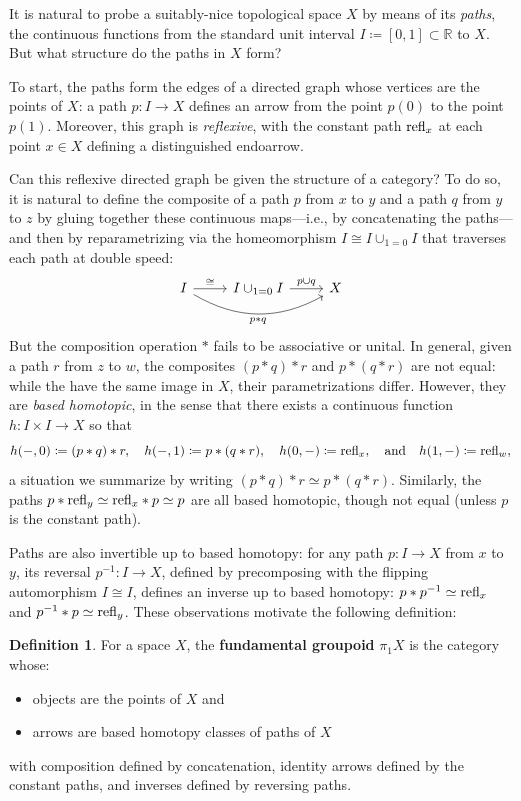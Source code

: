 \documentclass[11pt]{ctexart}
\theoremstyle{definition}
\newtheorem{defn}[thm]{Definition}
\theoremstyle{remark}
\numberwithin{equation}{section}
\newcommand{\refl}{\textup{refl}}
\newcommand{\RR}{\mathbb{R}}
\newcommand{\1}{\mathbbe{1}}
\newcommand{\2}{\mathbbe{2}}
\newcommand{\3}{\mathbbe{3}}
\begin{document}
It is natural to probe a suitably-nice topological space $X$ by means of its \emph{paths}, the continuous functions from the standard unit interval $I\coloneqq [0,1] \subset \RR$ to $X$. But what structure do the paths in $X$ form?

To start, the paths form the edges of a directed graph whose vertices are the points of $X$: a path $p \colon I \to X$ defines an arrow from the point $p(0)$ to the point $p(1)$. Moreover, this graph is \emph{reflexive}, with the constant path $\refl_x$ at each point $x \in X$ defining a distinguished endoarrow.

Can this reflexive directed graph be given the structure of a category? To do so, it is natural to define the composite of a path $p$ from $x$ to $y$ and a path $q$ from $y$ to $z$ by gluing together these continuous maps---i.e., by concatenating the paths---and then by reparametrizing via the homeomorphism $I \cong I \cup_{1=0} I$ that traverses each path at double speed:
\begin{equation}\label{eq:path-comp}
    \begin{tikzcd}
        I \arrow[r, "\cong"] \arrow[rr, bend right, "p \ast q"'] & I \cup_{1=0} I \arrow[r, "p \cup q"] & X
    \end{tikzcd}
\end{equation}
But the composition operation $\ast$ fails to be associative or unital. In general, given a path $r$ from $z$ to $w$, the composites $(p \ast q) \ast r$ and $p \ast (q \ast r)$ are not equal: while the have the same image in $X$, their parametrizations differ. However, they are \emph{based homotopic}, in the sense that there exists a continuous function $h \colon I \times I \to X$ so that
\[ h(-,0) \coloneqq (p \ast q) \ast r, \quad h(-,1) \coloneqq p \ast (q \ast r), \quad h(0,-) \coloneqq \refl_x, \quad \text{and} \quad h(1,-) \coloneqq \refl_w,\]
a situation we summarize by writing $(p \ast q) \ast r \simeq p \ast (q \ast r)$. Similarly, the paths $p \ast \refl_y \simeq \refl_x \ast p \simeq p$ are all based homotopic, though not equal (unless $p$ is the constant path).

Paths are also invertible up to based homotopy: for any path $p \colon I \to X$ from $x$ to $y$, its reversal $p^{-1} \colon I \to X$, defined by precomposing with the flipping automorphism $I \cong I$, defines an inverse up to based homotopy: $p \ast p^{-1} \simeq \refl_x$ and $p^{-1}\ast p \simeq \refl_y$.  These observations motivate the following definition:

\begin{defn} For a space $X$, the \textbf{fundamental groupoid} $\pi_1X$ is the category whose:
    \begin{itemize}
        \item objects are the points of $X$ and 
        \item arrows are based homotopy classes of paths of $X$
    \end{itemize}
    with composition defined by concatenation, identity arrows defined by the constant paths, and inverses defined by reversing paths.
\end{defn}
\end{document}
